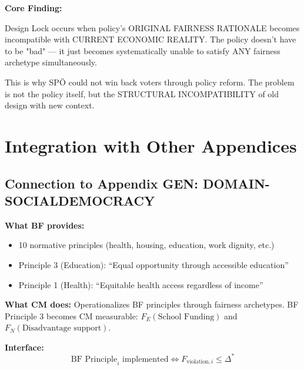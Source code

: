 \textbf{Core Finding:}

Design Lock occurs when policy's ORIGINAL FAIRNESS RATIONALE becomes incompatible with
CURRENT ECONOMIC REALITY. The policy doesn't have to be "bad" — it just becomes
systematically unable to satisfy ANY fairness archetype simultaneously.

This is why SPÖ could not win back voters through policy reform. The problem is not
the policy itself, but the STRUCTURAL INCOMPATIBILITY of old design with new context.

\section{Integration with Other Appendices}
\label{sec:cm-integration}

\subsection{Connection to Appendix GEN: DOMAIN-SOCIALDEMOCRACY}

\textbf{What BF provides:}
\begin{itemize}[nosep]
\item 10 normative principles (health, housing, education, work dignity, etc.)
\item Principle 3 (Education): ``Equal opportunity through accessible education''
\item Principle 1 (Health): ``Equitable health access regardless of income''
\end{itemize}

\textbf{What CM does:}
Operationalizes BF principles through fairness archetypes. BF Principle 3 becomes
CM measurable: $F_E(\text{School Funding})$ and $F_N(\text{Disadvantage support})$.

\textbf{Interface:}
\begin{equation}
\text{BF Principle}_i \text{ implemented} \iff F_{\text{violation},i} \leq \Delta^*
\end{equation}

